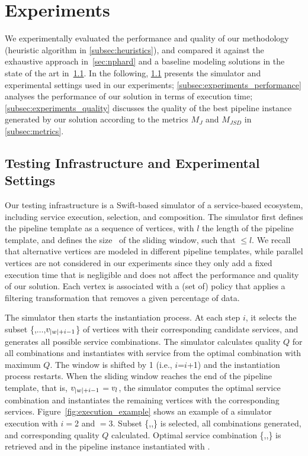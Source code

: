 \section{Experiments}\label{sec:experiment}
We experimentally evaluated the performance and quality of our methodology (heuristic algorithm in \cref{subsec:heuristics}), and compared it against the exhaustive approach in~\cref{sec:nphard}{\color{OurColor} and a baseline modeling solutions in the state of the art in~\cref{subsec:experiments_infrastructure}.} In the following,
\cref{subsec:experiments_infrastructure} presents the simulator and experimental settings used in our experiments;
\cref{subsec:experiments_performance} analyses the performance of our solution in terms of execution time; \cref{subsec:experiments_quality} discusses the quality of the best pipeline instance generated by our solution according to the metrics $M_J$ and $M_{JSD}$ in \cref{subsec:metrics}.

\subsection{Testing Infrastructure and Experimental Settings}\label{subsec:experiments_infrastructure}
Our testing infrastructure is a Swift-based simulator of a service-based ecosystem, including service execution, selection, and composition.
The simulator first defines the pipeline template as a sequence of vertices, with $l$ the length of the pipeline template, and defines the size \windowsize\ of the sliding window, such that \windowsize$\leq$$l$. We recall that alternative vertices are modeled in different pipeline templates, while parallel vertices are not considered in our experiments since they only add a fixed execution time that is negligible and does not affect the performance and quality of our solution. Each vertex is associated with a (set of) policy that applies a filtering transformation that removes a given percentage of data.


The simulator then starts the instantiation process. At each step $i$, it selects the subset \{,$\ldots$,$v_{|w|+i-1}$\} of vertices with their corresponding candidate services, and generates all possible service combinations. The simulator calculates quality $Q$ for all combinations and instantiates  with service  from the optimal combination with maximum $Q$. The window is shifted by 1 (i.e., $i$=$i$+1) and the instantiation process restarts. When the sliding window reaches the end of the pipeline template, that is, $v_{|w|+i-1}$$=$$v_{l}$, the simulator computes the optimal service combination and instantiates the remaining vertices with the corresponding services. Figure~\ref{fig:execution_example} shows an example of a simulator execution with $i$$=$2 and \windowsize$=$3. Subset \{,,\} is selected, all combinations generated, and corresponding quality $Q$ calculated. Optimal service combination \{,,\} is retrieved and  in the pipeline instance instantiated with .

